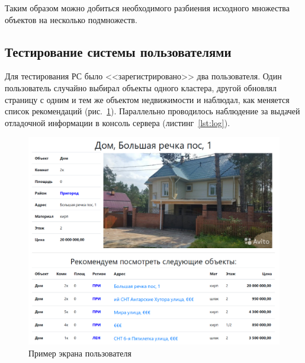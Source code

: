\documentclass[a4paper,14pt,openany,final]{extreport} %
\def\oldcaption{} \let\oldcaption=\caption
\def\caption{\stepcounter{captionsnum}\oldcaption}
\begin{document}
{Таким образом можно добиться необходимого разбиения исходного множества объектов на несколько подмножеств.

\subsection{Тестирование системы пользователями}
Для тестирования РС было <<зарегистрировано>> два пользователя. Один пользователь случайно выбирал объекты одного кластера, другой обновлял страницу с одним и тем же объектом недвижимости и наблюдал, как меняется список рекомендаций (рис.~\ref{fig:testingbyuser}). Параллельно проводилось наблюдение за выдачей отладочной информации в консоль сервера (листинг~\ref{lst:log}).

\begin{figure}[htbp]
  \centering
  \includegraphics[width=0.8\linewidth]{screen-recommends.png}
  \caption{Пример экрана пользователя}
  \label{fig:testingbyuser}
\end{figure}

}
\end{document}
